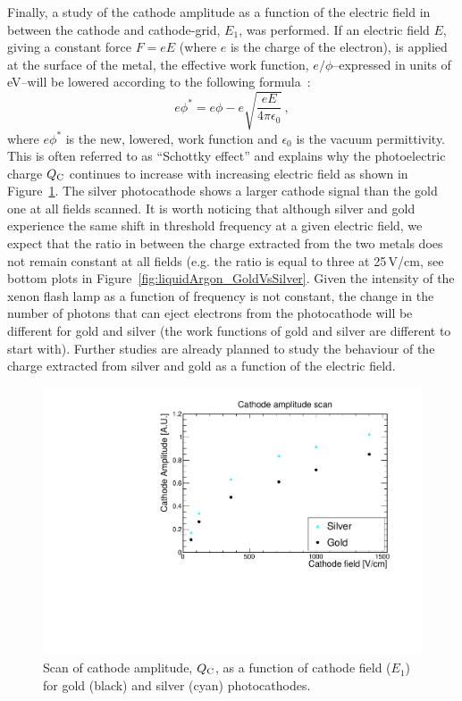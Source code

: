 \documentclass[a4paper,11pt]{article}
\newcommand{\QC}{\ensuremath{Q_{\rm C}}\xspace}
\begin{document}
Finally, a study of the cathode amplitude as a function of the electric field in between the cathode and cathode-grid, $E_1$, was performed. If an electric field $E$, giving a constant force $F = eE$ (where $e$ is the charge of the electron), is applied at the surface of the metal, the effective work function, $e/\phi$--expressed in units of eV--will be lowered according to the following formula~\cite{boer1935electron}:
\begin{equation}
    e\phi^* = e\phi - e\sqrt{\frac{e E}{4 \pi \epsilon_0}} \,,
\end{equation}
\noindent where $e\phi^*$ is the new, lowered, work function and $\epsilon_0$ is the vacuum permittivity. 
This is often referred to as ``Schottky effect'' and explains why the photoelectric charge \QC continues to increase with increasing electric field as shown in Figure~\ref{fig:cathodeScan}.
The silver photocathode shows a larger cathode signal  than the gold one at all fields scanned. It is worth noticing that although silver and gold experience the same shift in threshold frequency at a given electric field, we expect that the ratio in between the charge extracted from the two metals does not remain constant at all fields (e.g. the ratio is equal to three at 25\,V/cm, see bottom plots in Figure~\ref{fig:liquidArgon_GoldVsSilver}. Given the intensity of the xenon flash lamp as a function of frequency is not constant, the change in the number of photons that can eject electrons from the photocathode will be different for gold and silver (the work functions of gold and silver are different to start with). Further studies are already planned to study the behaviour of the charge extracted from silver and gold as a function of the electric field. 
\begin{figure}
    \centering
    \includegraphics[width=.7\linewidth]{figures/CathodeScan2018Aug14_ShortFibre_SilverGold.pdf}
    \caption{Scan of cathode amplitude, \QC, as a function of cathode field ($E_1$) for gold (black) and silver (cyan) photocathodes.}
    \label{fig:cathodeScan}
\end{figure}
\end{document}
